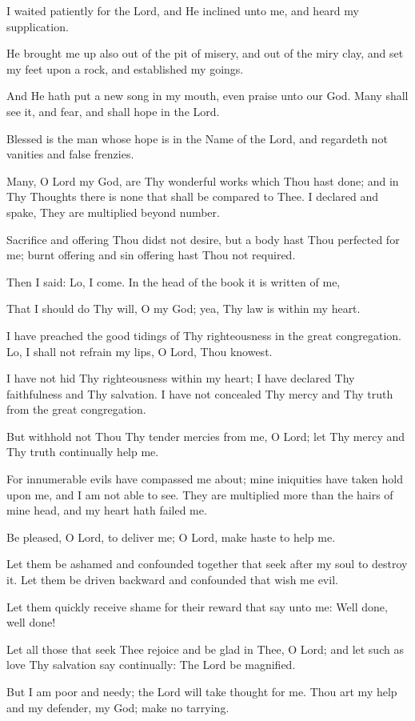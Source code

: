 I waited patiently for the Lord, and He inclined unto me, and heard my supplication.

He brought me up also out of the pit of misery, and out of the miry clay, and set my feet upon a rock, and established my goings.

And He hath put a new song in my mouth, even praise unto our God. Many shall see it, and fear, and shall hope in the Lord.

Blessed is the man whose hope is in the Name of the Lord, and regardeth not vanities and false frenzies.

Many, O Lord my God, are Thy wonderful works which Thou hast done; and in Thy Thoughts there is none that shall be compared to Thee. I declared and spake, They are multiplied beyond number.

Sacrifice and offering Thou didst not desire, but a body hast Thou perfected for me; burnt offering and sin offering hast Thou not required.

Then I said: Lo, I come. In the head of the book it is written of me,

That I should do Thy will, O my God; yea, Thy law is within my heart.

I have preached the good tidings of Thy righteousness in the great congregation. Lo, I shall not refrain my lips, O Lord, Thou knowest.

I have not hid Thy righteousness within my heart; I have declared Thy faithfulness and Thy salvation. I have not concealed Thy mercy and Thy truth from the great congregation.

But withhold not Thou Thy tender mercies from me, O Lord; let Thy mercy and Thy truth continually help me.

For innumerable evils have compassed me about; mine iniquities have taken hold upon me, and I am not able to see. They are multiplied more than the hairs of mine head, and my heart hath failed me.

Be pleased, O Lord, to deliver me; O Lord, make haste to help me.

Let them be ashamed and confounded together that seek after my soul to destroy it. Let them be driven backward and confounded that wish me evil.

Let them quickly receive shame for their reward that say unto me: Well done, well done!

Let all those that seek Thee rejoice and be glad in Thee, O Lord; and let such as love Thy salvation say continually: The Lord be magnified.

But I am poor and needy; the Lord will take thought for me. Thou art my help and my defender, my God; make no tarrying.
